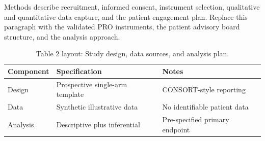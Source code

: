 
Methods describe recruitment, informed consent, instrument selection, qualitative and quantitative data capture, and the patient engagement plan. Replace this paragraph with the validated PRO instruments, the patient advisory board structure, and the analysis approach.

\begin{table}[H]
\caption{Table 2 layout: Study design, data sources, and analysis plan.}
\label{tab:methods_design}
\centering
\begin{tabular}{>{\raggedright\arraybackslash}p{3.4cm} >{\raggedright\arraybackslash}p{4.6cm} >{\raggedright\arraybackslash}p{5.4cm}}
\toprule
\textbf{Component} & \textbf{Specification} & \textbf{Notes} \\
\midrule
  Design & Prospective single-arm template & CONSORT-style reporting \\
  Data & Synthetic illustrative data & No identifiable patient data \\
  Analysis & Descriptive plus inferential & Pre-specified primary endpoint \\
\bottomrule
\end{tabular}
\end{table}
